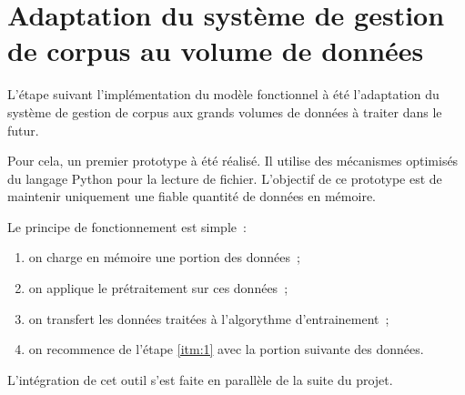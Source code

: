 \section{Adaptation du système de gestion de corpus au volume de données}
L'étape suivant l'implémentation du modèle fonctionnel à été l'adaptation du système de gestion de corpus aux grands volumes de données à traiter dans le futur.

Pour cela, un premier prototype à été réalisé.
Il utilise des mécanismes optimisés du langage Python pour la lecture de fichier.
L'objectif de ce prototype est de maintenir uniquement une fiable quantité de données en mémoire.

Le principe de fonctionnement est simple~:
\begin{enumerate}
	\item on charge en mémoire une portion des données~; \label{itm:1}
	\item on applique le prétraitement sur ces données~;
	\item on transfert les données traitées à l'algorythme d'entrainement~;
	\item on recommence de l'étape \ref{itm:1} avec la portion suivante des données.
\end{enumerate}
\vspace{1em}

L'intégration de cet outil s'est faite en parallèle de la suite du projet.